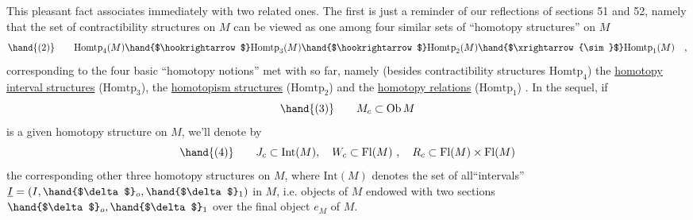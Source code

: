 This pleasant fact associates immediately with two related
ones. The first is just a reminder of our reflections of sections 51 and
52, namely that the set of contractibility structures on $M$ can be viewed
as one among four similar sets of ``homotopy structures'' on $M$
\[ \hand{(2)} \qquad \mathrm{Homtp}_4(M) \hand{$\hookrightarrow$} \mathrm{Homtp}_3(M) \hand{$\hookrightarrow$} \mathrm{Homtp}_2(M) \hand{$\xrightarrow{\sim}$} \mathrm{Homtp}_1(M) \quad , \]
corresponding to the four  basic ``homotopy notions'' met with so far,
namely (besides contractibility structures $\mathrm{Homtp}_4$) the  \uline{homotopy
interval structures} ($\mathrm{Homtp}_3$), the \uline{homotopism structures}  ($\mathrm{Homtp}_2$) and
the \uline{homotopy relations}  ($\mathrm{Homtp}_1$) . In the sequel, if 
\[ \hand{(3)} \qquad M_c \subset \mathrm{Ob}\, M \]
is a given homotopy structure on $M$, we'll denote by 
\[ \hand{(4)} \qquad J_c \subset \mathrm{Int}(M), \quad W_c \subset \mathrm{Fl}(M) \ , \quad R_c \subset \mathrm{Fl}(M)\times\mathrm{Fl}(M) \]
the corresponding other three homotopy structures on $M$, where $\mathrm{Int}(M)$
denotes the set of all``intervals'' $\underline{I} = (I, \hand{$\delta$}_o, \hand{$\delta$}_1)$ in $M$, i.e. objects of
$M$ endowed with two sections $\hand{$\delta$}_o,\hand{$\delta$}_1$ over the final object $e_M$ of $M$.

